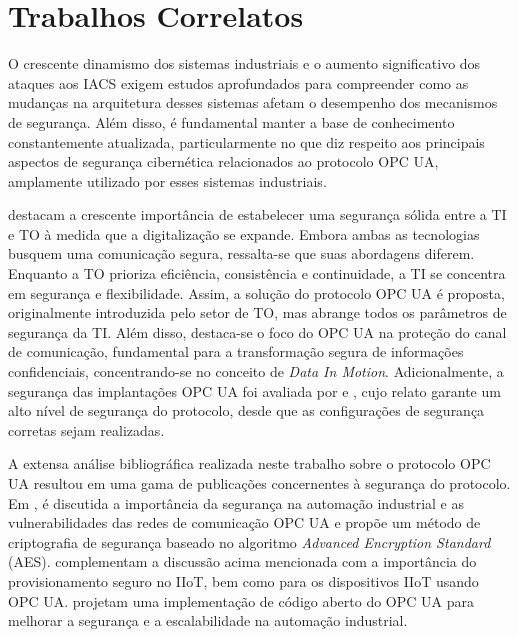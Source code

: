 \section{Trabalhos Correlatos} \label{sec:trabCorrelatos}

    O crescente dinamismo dos sistemas industriais e o aumento significativo dos ataques aos IACS exigem estudos aprofundados para compreender como as mudanças na arquitetura desses sistemas afetam o desempenho dos mecanismos de segurança. Além disso, é fundamental manter a base de conhecimento constantemente atualizada, particularmente no que diz respeito aos principais aspectos de segurança cibernética relacionados ao protocolo OPC UA, amplamente utilizado por esses sistemas industriais.

     destacam a crescente importância de estabelecer uma segurança sólida entre a TI e TO à medida que a digitalização se expande. Embora ambas as tecnologias busquem uma comunicação segura, ressalta-se que suas abordagens diferem. Enquanto a TO prioriza eficiência, consistência e continuidade, a TI se concentra em segurança e flexibilidade. Assim, a solução do protocolo OPC UA é proposta, originalmente introduzida pelo setor de TO, mas abrange todos os parâmetros de segurança da TI. Além disso, destaca-se o foco do OPC UA na proteção do canal de comunicação, fundamental para a transformação segura de informações confidenciais, concentrando-se no conceito de \textit{Data In Motion}. Adicionalmente, a segurança das implantações OPC UA foi avaliada por  e , cujo relato garante um alto nível de segurança do protocolo, desde que as configurações de segurança corretas sejam realizadas.

    A extensa análise bibliográfica realizada neste trabalho sobre o protocolo OPC UA resultou em uma gama de publicações concernentes à segurança do protocolo. Em \cite{luo2020}, é discutida a importância da segurança na automação industrial e as vulnerabilidades das redes de comunicação OPC UA e propõe um método de criptografia de segurança baseado no algoritmo \textit{Advanced Encryption Standard} (AES).  complementam a discussão acima mencionada com a importância do provisionamento seguro no IIoT, bem como \cite{kohnhauser2022} para os dispositivos IIoT usando OPC UA.  projetam uma implementação de código aberto do OPC UA para melhorar a segurança e a escalabilidade na automação industrial.

